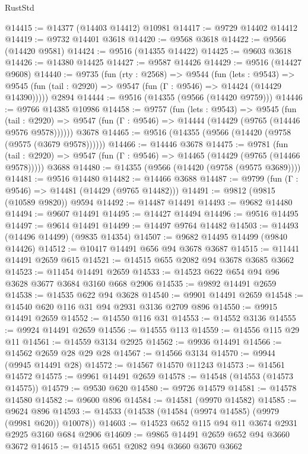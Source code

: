 \begin{lexlean}{RustStd}
\begin{coremodule}
@14415 := @14377 (@14403 @14412) @10981
@14417 := @9729 @14402 @14412
@14419 := @9732 @14401 @3618
@14420 := @9568 @3618
@14422 := @9566 (@14420 @9581)
@14424 := @9516 (@14355 @14422)
@14425 := @9603 @3618
@14426 := @14380 @14425
@14427 := @9587 @14426
@14429 := @9516 (@14427 @9608)
@14440 := @9735
    (fun (rty : @2568) =>
    @9544
      (fun (lets : @9543) =>
      @9545 (fun (tail : @2920) => @9547 (fun (Γ : @9546) => @14424 (@14429 @14390)))))
    @2894
@14444 := @9516 (@14355 (@9566 (@14420 @9759)))
@14446 := @9766 @14385 @10986
@14458 := @9757
    (fun (lets : @9543) =>
    @9545
      (fun (tail : @2920) =>
      @9547 (fun (Γ : @9546) => @14444 (@14429 (@9765 (@14446 @9576 @9578))))))
    @3678
@14465 := @9516 (@14355 (@9566 (@14420 (@9758 (@9575 (@3679 @9578))))))
@14466 := @14446 @3678
@14475 := @9781
    (fun (tail : @2920) => @9547 (fun (Γ : @9546) => @14465 (@14429 (@9765 (@14466 @9578)))))
    @3688
@14480 := @14355 (@9566 (@14420 (@9758 (@9575 @3689))))
@14481 := @9516 @14480
@14482 := @14466 @3688
@14487 := @9799 (fun (Γ : @9546) => @14481 (@14429 (@9765 @14482)))
@14491 := @9812 (@9815 (@10589 @9820)) @9594
@14492 := @14487 @14491
@14493 := @9682 @14480
@14494 := @9607 @14491
@14495 := @14427 @14494
@14496 := @9516 @14495
@14497 := @9614 @14491
@14499 := @14497 @9764 @14482
@14503 := @14493 (@14496 @14499) (@9835 @14354)
@14507 := @9682 @14495 @14499 (@9840 @14426)
@14512 := @10417 @14491 @656 @94 @3678 @3687
@14515 := @11441 @14491 @2659 @615
@14521 := @14515 @655 @2082 @94 @3678 @3685 @3662
@14523 := @11454 @14491 @2659
@14533 := @14523 @622 @654 @94 @96 @3628 @3677 @3684 @3160 @668 @2906
@14535 := @9892 @14491 @2659
@14538 := @14535 @622 @94 @3628
@14540 := @9901 @14491 @2659
@14548 := @14540 @620 @116 @31 @94 @2931 @3136 @2709 @896
@14550 := @9915 @14491 @2659
@14552 := @14550 @116 @31
@14553 := @14552 @3136
@14555 := @9924 @14491 @2659
@14556 := @14555 @113
@14559 := @14556 @115 @29 @11
@14561 := @14559 @3134 @2925
@14562 := @9936 @14491
@14566 := @14562 @2659 @28 @29 @28
@14567 := @14566 @3134
@14570 := @9944 (@9945 @14491 @28)
@14572 := @14567 @14570 @11243
@14573 := @14561 @14572
@14575 := @9961 @14491 @2659
@14578 := @14548 (@14553 (@14573 @14575))
@14579 := @9530 @620
@14580 := @9726 @14579
@14581 := @14578 @14580
@14582 := @9600 @896
@14584 := @14581 (@9970 @14582)
@14585 := @9624 @896
@14593 := @14533 (@14538 (@14584 (@9974 @14585) (@9979 (@9981 @620)) @10078))
@14603 := @14523 @652 @115 @94 @11 @3674 @2931 @2925 @3160 @684 @2906
@14609 := @9865 @14491 @2659 @652 @94 @3660 @3672
@14615 := @14515 @651 @2082 @94 @3660 @3670 @3662

\end{coremodule}
\end{lexlean}
